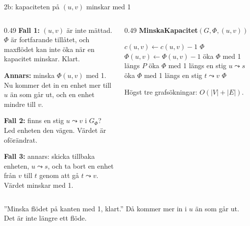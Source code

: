 \documentclass[11pt,aspectratio=169,xcolor=table,t]{beamer}
\begin{document}
\begin{frame}{2b: kapaciteten på $(u,v)$ minskar med 1}
\begin{columns}[T]
\begin{column}{0.49\textwidth}
\small
\textbf{Fall 1:} $(u,v)$ är inte mättad. $\Phi$ är fortfarande tillåtet, och maxflödet kan inte
öka när en kapacitet minskar. Klart.\par\smallskip
\textbf{Annars:} minska $\Phi(u,v)$ med 1. Nu kommer det in en enhet mer till $u$ än som går ut,
och en enhet mindre till $v$.\par\smallskip
\textbf{Fall 2:} finns en stig $u\leadsto v$ i $G_\Phi$? Led enheten den vägen. Värdet är
oförändrat.\par\smallskip
\textbf{Fall 3:} annars: skicka tillbaka enheten, $u\leadsto s$, och ta bort en enhet från $v$
till $t$ genom att gå $t\leadsto v$. Värdet minskar med 1.
\end{column}
\begin{column}{0.49\textwidth}
{\small\bfseries\color{kthnavy}MinskaKapacitet$(G,\Phi,(u,v))$}
\footnotesize
\begin{algorithmic}[1]
\State $c(u,v)\gets c(u,v)-1$
 \State \Return $\Phi$ 
\EndIf
\State $\Phi(u,v)\gets\Phi(u,v)-1$ 
  \State öka $\Phi$ med 1 längs $P$ 
\Else
  \State öka $\Phi$ med 1 längs en stig $u\leadsto s$ 
  \State öka $\Phi$ med 1 längs en stig $t\leadsto v$
\EndIf
\State \Return $\Phi$
\end{algorithmic}
\smallskip
{\footnotesize Högst tre grafsökningar: $O(|V|+|E|)$.}
\end{column}
\end{columns}
\vfill
\begin{missbox}
”Minska flödet på kanten med 1, klart.” Då kommer mer in i $u$ än som går ut. Det är inte längre
ett flöde.
\end{missbox}
\end{frame}
\end{document}
